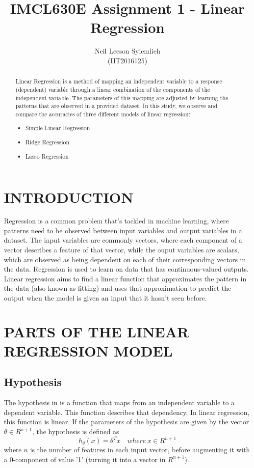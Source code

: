\documentclass[letterpaper, 10 pt, conference]{ieeeconf}  %
\title{\LARGE \bf
IMCL630E Assignment 1 - Linear Regression
}
\author{
Neil Leeson Syiemlieh \\
(IIT2016125)
}
\begin{document}
\maketitle
\thispagestyle{empty}
\pagestyle{empty}


\begin{abstract}
Linear Regression is a method of mapping an independent variable to a response (dependent) variable through a linear combination of the components of the independent variable. The parameters of this mapping are adjusted by learning the patterns that are observed in a provided
dataset. In this study, we observe and compare the accuracies of three different models of linear regression:
\begin{itemize}
  \item Simple Linear Regression
  \item Ridge Regression
  \item Lasso Regression
\end{itemize}
\end{abstract}

\section{INTRODUCTION}
Regression is a common problem that's tackled in machine learning, where patterns need to be observed between input variables and output variables in a dataset. The input variables are commonly vectors, where each component of a vector describes a feature of that vector, while the ouput variables are scalars, which are observed as being dependent on each of their corresponding vectors in the data. Regression is used to learn on data that has continuous-valued outputs. Linear regression aims to find a linear function that approximates the pattern in the data (also known as fitting) and uses that approximation to predict the output when the model is given an input that it hasn't seen before.

\section{PARTS OF THE LINEAR\\REGRESSION MODEL}

\subsection{Hypothesis}
The hypothesis in is a function that maps from an independent variable to a dependent variable. This function describes that dependency. In linear regression, this function is linear. If the parameters of the hypothesis are given by the vector $\theta \in R^{n+1}$, the hypothesis is defined as
\[h_\theta(x) = \theta^T x \quad where\ x \in R^{n+1}\]
where $n$ is the number of features in each input vector, before augmenting it with a 0-component of value '1' (turning it into a vector in $R^{n+1}$).
\end{document}
